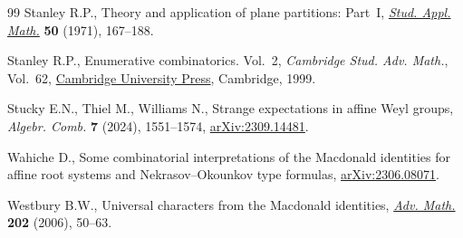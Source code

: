 \documentclass[pdftex]{sigma}
\numberwithin{equation}{section}
\begin{document}
\begin{thebibliography}{99}
Stanley R.P., Theory and application of plane partitions: {P}art~{I},
 \href{https://doi.org/10.1002/sapm1971502167}{\textit{Stud. Appl. Math.}} \textbf{50} (1971), 167--188.

Stanley R.P., Enumerative combinatorics. {V}ol.~2, \textit{Cambridge Stud. Adv.
 Math.}, Vol.~62, \href{https://doi.org/10.1017/CBO9780511609589}{Cambridge University Press}, Cambridge, 1999.

Stucky E.N., Thiel M., Williams N., Strange expectations in affine {W}eyl
 groups, \textit{Algebr. Comb.} \textbf{7} (2024), 1551--1574,
 \href{https://arxiv.org/abs/2309.14481}{arXiv:2309.14481}.

Wahiche D., Some combinatorial interpretations of the Macdonald identities for
 affine root systems and Nekrasov--Okounkov type formulas,
 \href{https://arxiv.org/abs/2306.08071}{arXiv:2306.08071}.

Westbury B.W., Universal characters from the {M}acdonald identities,
 \href{https://doi.org/10.1016/j.aim.2005.03.013}{\textit{Adv. Math.}} \textbf{202} (2006), 50--63.

\end{thebibliography}\LastPageEnding
\end{document}
